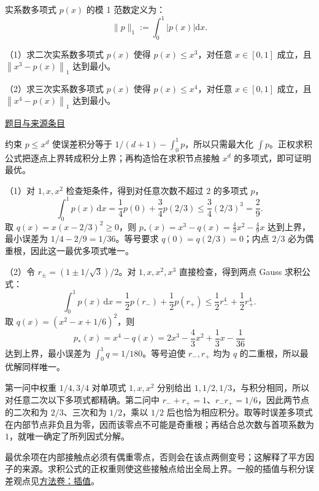 \documentclass[UTF8,12pt,a4paper,fontset=fandol]{ctexart}
\begin{document}
\begin{example}\label{ex:fin07-hi:11}\label{pr:fin07-hi:11}

实系数多项式 $p(x)$ 的模 1 范数定义为：
\[
\|p\|_{1}:=\int_{0}^{1}\left|p(x)\right|\mathrm{d}x.
\]

（1）求二次实系数多项式 $p(x)$ 使得 $p(x)\leq x^{3}$，对任意 $x\in[0,1]$ 成立，且 $\left\|x^{3}-p(x)\right\|_{1}$ 达到最小。

（2）求三次实系数多项式 $p(x)$ 使得 $p(x)\leq x^{4}$，对任意 $x\in[0,1]$ 成立，且 $\left\|x^{4}-p(x)\right\|_{1}$ 达到最小。

\par\href{https://github.com/lzxcr/cmc-mathematics/blob/64916fa1fdbc3e444a652eca204d5669058ee321/src/problems/finals/07/13.md}{题目与来源条目}

\end{example}

\begin{solve}\label{ans:fin07-hi:11}

约束 $p\leq x^d$ 使误差积分等于 $1/(d+1)-\int_0^1p$，所以只需最大化 $\int p$。正权求积公式把逐点上界转成积分上界；再构造恰在求积节点接触 $x^d$ 的多项式，即可证明最优。

（1）对 $1,x,x^2$ 检查矩条件，得到对任意次数不超过 $2$ 的多项式 $p$，
\[
\int_0^1p(x)\,\mathrm{d}x=\frac14p(0)+\frac34p(2/3)\leq\frac34(2/3)^3=\frac29.
\]
取 $q(x)=x(x-2/3)^2\geq0$，则 $p_*(x)=x^3-q(x)=\frac43x^2-\frac49x$ 达到上界，最小误差为 $1/4-2/9=1/36$。等号要求 $q(0)=q(2/3)=0$；内点 $2/3$ 必为偶重根，因此这一最优多项式唯一。

（2）令 $r_\pm=(1\pm1/\sqrt3)/2$。对 $1,x,x^2,x^3$ 直接检查，得到两点 Gauss 求积公式：
\[
\int_0^1p(x)\,\mathrm{d}x=\frac12p(r_-)+\frac12p(r_+)\leq\frac12r_-^4+\frac12r_+^4.
\]
取 $q(x)=(x^2-x+1/6)^2$，则
\[
p_*(x)=x^4-q(x)=2x^3-\frac43x^2+\frac13x-\frac1{36}
\]
达到上界，最小误差为 $\int_0^1q=1/180$。等号迫使 $r_-,r_+$ 均为 $q$ 的二重根，所以最优解同样唯一。

第一问中权重 $1/4,3/4$ 对单项式 $1,x,x^2$ 分别给出 $1,1/2,1/3$，与积分相同，所以对任意二次以下多项式都精确。第二问中 $r_-+r_+=1$、$r_-r_+=1/6$，因此两节点的二次和为 $2/3$、三次和为 $1/2$，乘以 $1/2$ 后也恰为相应积分。取等时误差多项式在内部节点非负且为零，因而该零点不可能是奇重根；再结合总次数与首项系数为 $1$，就唯一确定了所列因式分解。

\end{solve}

\begin{remark}[方法与条件]最优余项在内部接触点必须有偶重零点，否则会在该点两侧变号；这解释了平方因子的来源。求积公式的正权重则使这些接触点给出全局上界。一般的插值与积分误差观点见\hyperref[app:estimate-interpolation]{方法卷：插值}。\end{remark}
\end{document}
